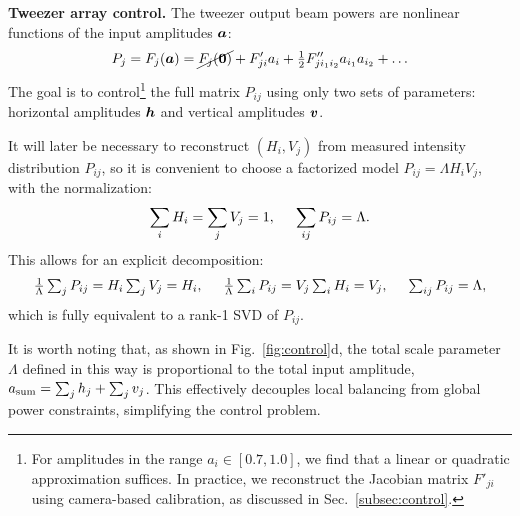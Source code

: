 \textbf{Tweezer array control.} The tweezer output beam powers are nonlinear functions of the input amplitudes $\boldsymbol{a}$:
\begin{equation}
    \label{eq:taylerexp}
    P_j = F_j(\boldsymbol{a}) = \cancel{F_j(\boldsymbol{0})} + F'_{ji} a_i + \tfrac{1}{2} F''_{j i_1 i_2} a_{i_1} a_{i_2} + \ldots
\end{equation}
The goal is to control\footnote{
    For amplitudes in the range $a_i \in [0.7, 1.0]$, we find that a linear or quadratic approximation suffices. In practice, we reconstruct the Jacobian matrix $F'_{ji}$ using camera-based calibration, as discussed in Sec.~\ref{subsec:control}.
} the full matrix $P_{ij}$ using only two sets of parameters: horizontal amplitudes $\boldsymbol{h}$ and vertical amplitudes $\boldsymbol{v}$. 

It will later be necessary to reconstruct $(H_i, V_j)$ from measured intensity distribution $P_{ij}$, so it is convenient to choose a factorized model $P_{ij} = \Lambda H_i V_j$, with the normalization:
\begin{equation*}
    \sum_i H_i = \sum_j V_j = 1, \hspace{5 mm} \sum_{ij} P_{ij} = \Lambda.
\end{equation*}
This allows for an explicit decomposition:
\begin{equation}
    \textstyle
    \frac{1}{\Lambda} \sum_j P_{ij} = H_i \sum_j V_j = H_i,
    \hspace{5 mm} 
    \frac{1}{\Lambda} \sum_i P_{ij} = V_j \sum_i H_i = V_j,
    \hspace{5 mm} 
    \sum_{ij} P_{ij} = \Lambda,
    \label{uv-decomposition}
\end{equation}
which is fully equivalent to a rank-1 SVD of $P_{ij}$.

It is worth noting that, as shown in Fig.~\ref{fig:control}d, the total scale parameter $\Lambda$ defined in this way is proportional to the total input amplitude, $a_{\textnormal{sum}} = \sum_j h_j + \sum_j v_j$. This effectively decouples local balancing from global power constraints, simplifying the control problem.

